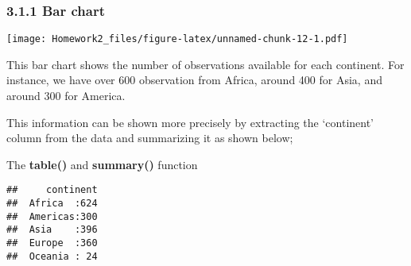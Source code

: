 \documentclass[]{article}
\newenvironment{Shaded}{\begin{snugshade}}{\end{snugshade}}
\newcommand{\KeywordTok}[1]{\textcolor[rgb]{0.13,0.29,0.53}{\textbf{{#1}}}}
\newcommand{\DataTypeTok}[1]{\textcolor[rgb]{0.13,0.29,0.53}{{#1}}}
\newcommand{\StringTok}[1]{\textcolor[rgb]{0.31,0.60,0.02}{{#1}}}
\newcommand{\CommentTok}[1]{\textcolor[rgb]{0.56,0.35,0.01}{\textit{{#1}}}}
\newcommand{\NormalTok}[1]{{#1}}
\begin{document}
\subsubsection{\texorpdfstring{3.1.1 \textbf{Bar
chart}}{3.1.1 Bar chart}}\label{bar-chart}

\begin{Shaded}
\end{Shaded}

\texttt{[image: Homework2\_files/figure-latex/unnamed-chunk-12-1.pdf]}

This bar chart shows the number of observations available for each
continent. For instance, we have over 600 observation from Africa,
around 400 for Asia, and around 300 for America.

This information can be shown more precisely by extracting the
`continent' column from the data and summarizing it as shown below;

The \textbf{table()} and \textbf{summary()} function

\begin{Shaded}
\end{Shaded}

\begin{verbatim}
##     continent  
##  Africa  :624  
##  Americas:300  
##  Asia    :396  
##  Europe  :360  
##  Oceania : 24
\end{verbatim}
\end{document}
